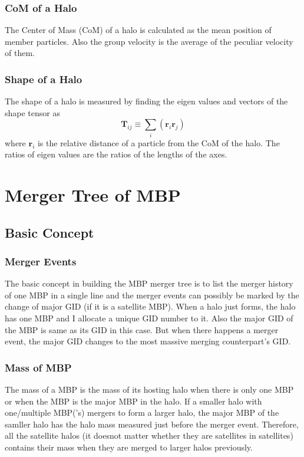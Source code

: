 \documentclass[openleft]{memoir}
\begin{document}
\subsection{CoM of a Halo}
The Center of Mass (CoM) of a halo is calculated as the mean position of member particles. Also the group velocity
is the average of the peculiar velocity of them.

\subsection{Shape of a Halo}
The shape of a halo is measured by finding the eigen values and vectors of the shape tensor as
\begin{equation}
\boldsymbol{T}_{ij} \equiv \sum_i (\boldsymbol{r}_i \boldsymbol{r}_j)
\end{equation}
where $\boldsymbol{r}_i$ is the relative distance of a particle from the CoM of the halo.
The ratios of eigen values are the ratios of the lengths of the axes.



\chapter{Merger Tree of MBP}
\section{Basic Concept}

\subsection{Merger Events}
The basic concept in building the MBP merger tree is to list the merger history of one MBP in a single line
and the merger events can possibly be marked by the change of major GID (if it is a satellite MBP).
When a halo just forms, the halo has one MBP and I allocate a unique GID number to it. 
Also the major GID of the MBP is same as its GID in this case.
But when there happens a merger event, the major GID changes to the most massive merging counterpart's GID.
\subsection{Mass of MBP}
The mass of a MBP is the mass of its hosting halo when there is only one MBP or when the MBP is the major MBP
in the halo. If a smaller halo with one/multiple MBP('s) mergers to form a larger halo, the major MBP of the samller halo
has the halo mass measured just before the merger event. Therefore, all the satellite halos (it doesnot matter whether they
are satellites in satellites) contains their mass when they are merged to larger halos previously.
\end{document}
